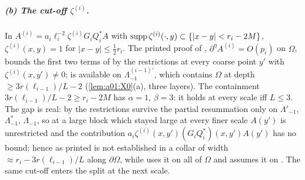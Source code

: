 \subparagraph{(b) The cut-off $\zeta^{(i)}$.} In \cite[(2.44)]{Ba2} $A^{(i)}=a_i\ell_i^{-2}\zeta^{(i)}G_iQ_i^*A$ with $\operatorname{supp}\zeta^{(i)}(\cdot,y)\subset\{|x-y|<r_i-2M\}$, $\zeta^{(i)}(x,y)=1$ for $|x-y|\le\frac12r_i$. The printed proof of \cite[(2.60)]{Ba2}, $\partial^\eta A^{(i)}=O(p_i)$ on $\Omega$, bounds the first two terms of \cite[(2.61)]{Ba2} by the restrictions \cite[(2.55)]{Ba2} at every coarse point $y'$ with $\zeta^{(i)}(x,y')\ne0$; \cite[(2.55)]{Ba2} is available on $\Lambda_{-1}^{(i-1)\prime}$, which contains $\Omega$ at depth $\ge3r(\ell_{i-1})/L-2$ (\cref{lem:a01:X0}(a), three layers). The containment $3r(\ell_{i-1})/L-2\ge r_i-2M$ has $\alpha=1$, $\beta=3$: it holds at every scale iff $L\le3$. The gap is real: by \cite[(2.9)]{Ba2} the restrictions survive the partial resummation only on $\Lambda'_{-1}$, $\Lambda^*_{-1}$, $\Lambda_{-1}$, so at a large block which stayed large at every finer scale $A(y')$ is unrestricted and the contribution $a_i\zeta^{(i)}(x,y')(G_iQ_i^*)(x,y')A(y')$ has no bound; hence \cite[(2.60)]{Ba2} as printed is not established in a collar of width $\approx r_i-3r(\ell_{i-1})/L$ along $\partial\Omega$, while \cite[p.~571]{Ba2} uses it on all of $\Omega$ and \cite[Prop.~1]{Ba3} assumes it on \cite[p.~412]{Ba3}. The same cut-off enters the split \cite[(2.89)]{Ba2} at the next scale.

